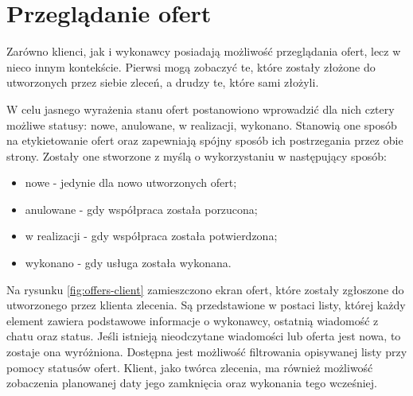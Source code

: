 \section{Przeglądanie ofert}

Zarówno klienci, jak i wykonawcy posiadają możliwość przeglądania ofert, lecz w nieco innym kontekście. Pierwsi mogą zobaczyć te, które zostały złożone do utworzonych przez siebie zleceń, a drudzy te, które sami złożyli.

W celu jasnego wyrażenia stanu ofert postanowiono wprowadzić dla nich  cztery  możliwe statusy: nowe, anulowane, w realizacji, wykonano. Stanowią one sposób na etykietowanie ofert oraz zapewniają spójny sposób ich postrzegania przez obie strony. Zostały one stworzone z myślą o wykorzystaniu w następujący sposób:

\begin{itemize}
    \item nowe - jedynie dla nowo utworzonych ofert;
    \item anulowane - gdy współpraca została porzucona;
    \item w realizacji - gdy współpraca została potwierdzona;
    \item wykonano - gdy usługa została wykonana.
\end{itemize}


Na rysunku \ref{fig:offers-client} zamieszczono ekran ofert, które zostały zgłoszone do utworzonego przez klienta zlecenia. Są przedstawione w postaci listy, której każdy element zawiera podstawowe informacje o wykonawcy, ostatnią wiadomość z chatu oraz status. Jeśli istnieją nieodczytane wiadomości lub oferta jest nowa, to zostaje ona wyróżniona. Dostępna jest możliwość filtrowania opisywanej listy przy pomocy statusów ofert. Klient, jako twórca zlecenia, ma również możliwość zobaczenia planowanej daty jego zamknięcia oraz wykonania tego wcześniej.

